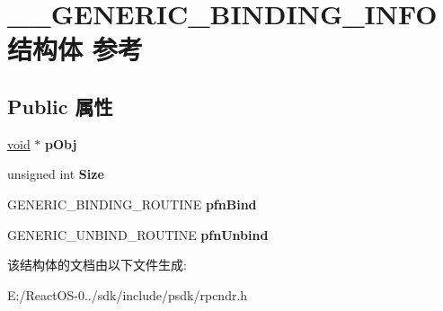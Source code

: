 \hypertarget{struct_____g_e_n_e_r_i_c___b_i_n_d_i_n_g___i_n_f_o}{}\section{\+\_\+\+\_\+\+G\+E\+N\+E\+R\+I\+C\+\_\+\+B\+I\+N\+D\+I\+N\+G\+\_\+\+I\+N\+F\+O结构体 参考}
\label{struct_____g_e_n_e_r_i_c___b_i_n_d_i_n_g___i_n_f_o}
\subsection*{Public 属性}
\begin{DoxyCompactItemize}
\item 
\mbox{\label{struct_____g_e_n_e_r_i_c___b_i_n_d_i_n_g___i_n_f_o_a9e4777821aea972cb23d435e4e69bfee}} 
\hyperlink{interfacevoid}{void} $\ast$ {\bfseries p\+Obj}
\item 
\mbox{\label{struct_____g_e_n_e_r_i_c___b_i_n_d_i_n_g___i_n_f_o_a03ecdc6b236c1fb2a6e567d47a72712d}} 
unsigned int {\bfseries Size}
\item 
\mbox{\label{struct_____g_e_n_e_r_i_c___b_i_n_d_i_n_g___i_n_f_o_a6fa05604fac9e3dc214b80e1b8f0a572}} 
G\+E\+N\+E\+R\+I\+C\+\_\+\+B\+I\+N\+D\+I\+N\+G\+\_\+\+R\+O\+U\+T\+I\+NE {\bfseries pfn\+Bind}
\item 
\mbox{\label{struct_____g_e_n_e_r_i_c___b_i_n_d_i_n_g___i_n_f_o_ac9392cb3359cd3071e587de8cbc8f274}} 
G\+E\+N\+E\+R\+I\+C\+\_\+\+U\+N\+B\+I\+N\+D\+\_\+\+R\+O\+U\+T\+I\+NE {\bfseries pfn\+Unbind}
\end{DoxyCompactItemize}


该结构体的文档由以下文件生成\+:\begin{DoxyCompactItemize}
\item 
E\+:/\+React\+O\+S-\/0../sdk/include/psdk/rpcndr.\+h\end{DoxyCompactItemize}

